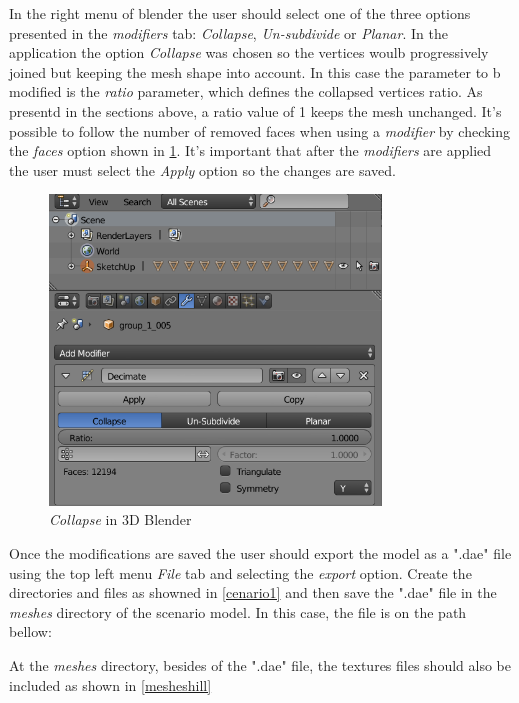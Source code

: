 	
	In the right menu of blender the user should select one of the three options presented in the \textit{modifiers} tab: \textit{Collapse}, \textit{Un-subdivide} or \textit{Planar}. In the application the option \textit{Collapse} was chosen so the vertices woulb progressively joined but keeping the mesh shape into account. In this case the parameter to b modified is the \textit{ratio} parameter, which defines the collapsed vertices ratio. As presentd in the sections above, a ratio value of 1 keeps the mesh unchanged. It's possible to follow the number of removed faces when using a \textit{modifier} by checking the \textit{faces} option shown in \ref{hillblendermod}. It's important that after the \textit{modifiers} are applied the user must select the \textit{Apply} option so the changes are saved.
	
	
		\begin{figure}[!ht]
		\centering
		\includegraphics[width=250pt]{figuras/hillblendermod.png}
		\caption{\textit{Collapse} in 3D Blender}
		\label{hillblendermod}
	\end{figure}
	
	Once the modifications are saved the user should export the model as a ".dae" file using the top left menu \textit{File} tab and selecting the \textit{export} option. Create the directories and files as showned in \ref{cenario1} and then save the ".dae" file in the \textit{meshes} directory of the scenario model. In this case, the file is on the path bellow:

	
	\label{daefile}
	

At the \textit{meshes} directory, besides of the ".dae" file, the textures files should also be included as shown in \ref{mesheshill}



